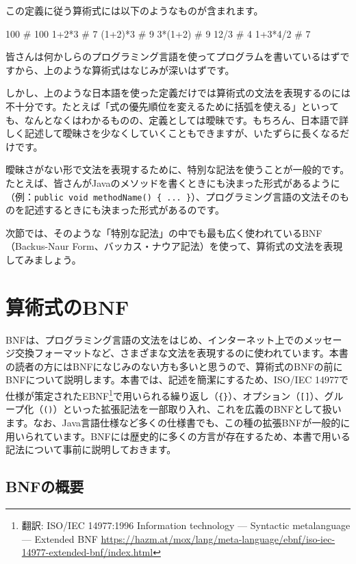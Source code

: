 この定義に従う算術式には以下のようなものが含まれます。

\begin{codescreen}{}
100      # 100
1+2*3    # 7
(1+2)*3  # 9
3*(1+2)  # 9
12/3     # 4
1+3*4/2  # 7
\end{codescreen}

皆さんは何かしらのプログラミング言語を使ってプログラムを書いているはずですから、上のような算術式はなじみが深いはずです。

しかし、上のような日本語を使った定義だけでは算術式の文法を表現するのには不十分です。たとえば「式の優先順位を変えるために括弧を使える」といっても、なんとなくはわかるものの、定義としては曖昧です。もちろん、日本語で詳しく記述して曖昧さを少なくしていくこともできますが、いたずらに長くなるだけです。

曖昧さがない形で文法を表現するために、特別な記法を使うことが一般的です。たとえば、皆さんがJavaのメソッドを書くときにも決まった形式があるように（例：\texttt{public\ void\ methodName()\ \{\ ...\ \}}）、プログラミング言語の文法そのものを記述するときにも決まった形式があるのです。

次節では、そのような「特別な記法」の中でも最も広く使われているBNF（Backus-Naur
Form、バッカス・ナウア記法）を使って、算術式の文法を表現してみましょう。

\section{算術式のBNF}

BNFは、プログラミング言語の文法をはじめ、インターネット上でのメッセージ交換フォーマットなど、さまざまな文法を表現するのに使われています。本書の読者の方にはBNFになじみのない方も多いと思うので、算術式のBNFの前にBNFについて説明します。本書では、記述を簡潔にするため、ISO/IEC
14977で仕様が策定されたEBNF\footnote{翻訳: ISO/IEC 14977:1996
  Information technology --- Syntactic metalanguage --- Extended BNF
  \url{https://hazm.at/mox/lang/meta-language/ebnf/iso-iec-14977-extended-bnf/index.html}}で用いられる繰り返し（\texttt{\{\}}）、オプション（\texttt{{[}{]}}）、グループ化（\texttt{()}）といった拡張記法を一部取り入れ、これを広義のBNFとして扱います。なお、Java言語仕様など多くの仕様書でも、この種の拡張BNFが一般的に用いられています。BNFには歴史的に多くの方言が存在するため、本書で用いる記法について事前に説明しておきます。

\subsection{BNFの概要}

